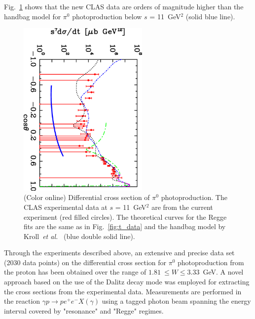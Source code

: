 \documentclass[aps,prc,twocolumn,floatfix,showpacs,preprintnumbers,amsmath,amssymb,superscriptaddress]{revtex4-1}
\begin{document}
Fig.~\ref{fig:kroll} shows that the new CLAS data 
are orders of magnitude higher than 
the handbag model for $\pi^0$ photoproduction below 
$s$ = 11~GeV$^2$ (solid blue line).

\begin{figure}
\centerline{
        \includegraphics[width=2.5in, angle=90]{kroll.eps}}

        \caption {(Color online) Differential cross section 
		of $\pi^0$ photoproduction. The CLAS experimental 
		data at $s$ = 11~GeV$^2$ are from the 
		current experiment (red filled circles).  
		The theoretical curves for the Regge 
		fits are the same as in 
		Fig.~\protect\ref{fig:t_data} and the handbag model 
		by Kroll~\protect\textit{et 
		al.}~\protect\cite{Kroll} 
		(blue double solid line).} 
		\label{fig:kroll}
\end{figure}

Through the experiments described above, an extensive and
precise data set (2030 data points) on the differential cross section for 
$\pi^0$ photoproduction from the proton has been obtained over 
the range of $1.81~\leq W\leq 3.33$~GeV. A novel approach based 
on the use of the Dalitz decay mode was employed for extracting the 
cross sections from the experimental data. Measurements are 
performed in the reaction $\gamma p\to pe^+e^-X(\gamma)$ using a 
tagged photon beam spanning the energy interval covered by 
"resonance" and "Regge" regimes.
\end{document}
